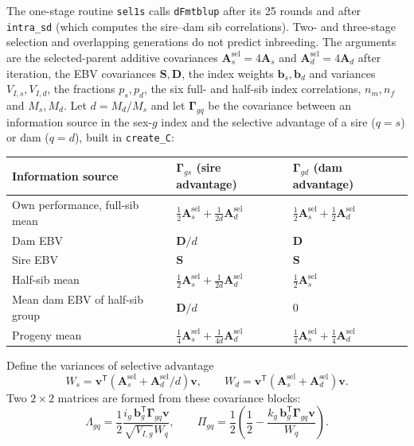 \documentclass[11pt]{article}
\newcommand{\src}[1]{\texttt{#1}}
\newcommand{\ve}[1]{\boldsymbol{#1}}
\newcommand{\ma}[1]{\mathbf{#1}}
\begin{document}
The one-stage routine \src{sel1s} calls \src{dFmtblup} after its 25 rounds and after \src{intra\_sd} (which computes the sire--dam sib correlations). Two- and three-stage selection and overlapping generations do not predict inbreeding. The arguments are the selected-parent additive covariances $\ma A_s^{\mathrm{sel}}=4\ma A_s$ and $\ma A_d^{\mathrm{sel}}=4\ma A_d$ after iteration, the EBV covariances $\ma S,\ma D$, the index weights $\ve b_s,\ve b_d$ and variances $V_{I,s},V_{I,d}$, the fractions $p_s,p_d$, the six full- and half-sib index correlations, $n_m,n_f$ and $M_s,M_d$. Let $d=M_d/M_s$ and let $\ma\Gamma_{gq}$ be the covariance between an information source in the sex-$g$ index and the selective advantage of a sire ($q=s$) or dam ($q=d$), built in \src{create\_C}:
\begin{center}
\begin{tabular}{lll}\toprule
Information source & $\ma\Gamma_{gs}$ (sire advantage) & $\ma\Gamma_{gd}$ (dam advantage)\\\midrule
Own performance, full-sib mean & $\tfrac12\ma A_s^{\mathrm{sel}}+\tfrac1{2d}\ma A_d^{\mathrm{sel}}$ & $\tfrac12\ma A_s^{\mathrm{sel}}+\tfrac12\ma A_d^{\mathrm{sel}}$\\
Dam EBV & $\ma D/d$ & $\ma D$\\
Sire EBV & $\ma S$ & $\ma S$\\
Half-sib mean & $\tfrac12\ma A_s^{\mathrm{sel}}+\tfrac1{2d}\ma A_d^{\mathrm{sel}}$ & $\tfrac12\ma A_s^{\mathrm{sel}}$\\
Mean dam EBV of half-sib group & $\ma D/d$ & $0$\\
Progeny mean & $\tfrac14\ma A_s^{\mathrm{sel}}+\tfrac1{4d}\ma A_d^{\mathrm{sel}}$ & $\tfrac14\ma A_s^{\mathrm{sel}}+\tfrac14\ma A_d^{\mathrm{sel}}$\\\bottomrule
\end{tabular}
\end{center}
Define the variances of selective advantage
\begin{equation}\label{eq:vsa}
W_s=\ve v^{\mathsf T}(\ma A_s^{\mathrm{sel}}+\ma A_d^{\mathrm{sel}}/d)\ve v,\qquad
W_d=\ve v^{\mathsf T}(\ma A_s^{\mathrm{sel}}+\ma A_d^{\mathrm{sel}})\ve v.
\end{equation}
Two $2\times2$ matrices are formed from these covariance blocks:
\begin{equation}\label{eq:inbreedmatrix}
\Lambda_{gq}=\frac12\frac{i_g\,\ve b_g^{\mathsf T}\ma\Gamma_{gq}\ve v}{\sqrt{V_{I,g}}W_q},\qquad
\Pi_{gq}=\frac12\left(\frac12-\frac{k_g\,\ve b_g^{\mathsf T}\ma\Gamma_{gq}\ve v}{W_q}\right).
\end{equation}
\end{document}
